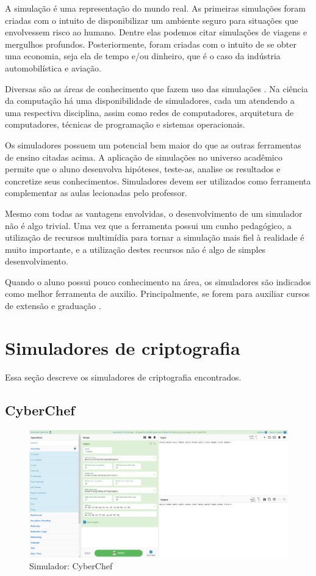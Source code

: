 A simulação é uma representação do mundo real. As primeiras simulações foram criadas com o intuito de disponibilizar um ambiente seguro para situações que envolvessem risco ao humano. Dentre elas podemos citar simulações de viagens e mergulhos profundos. Posteriormente, foram criadas com o intuito de se obter uma economia, seja ela de tempo e/ou dinheiro, que é o caso da indústria automobilística e aviação.

Diversas são as áreas de conhecimento que fazem uso das simulações \cite{banks09}. Na ciência da computação há uma disponibilidade de simuladores, cada um atendendo a uma respectiva disciplina, assim como redes de computadores, arquitetura de computadores, técnicas de programação e sistemas operacionais.

Os simuladores possuem um potencial bem maior do que as outras ferramentas de ensino citadas acima. A aplicação de simulações no universo acadêmico permite que o aluno desenvolva hipóteses, teste-as, analise os resultados e concretize seus conhecimentos. Simuladores devem ser utilizados como ferramenta complementar as aulas lecionadas pelo professor.

Mesmo com todas as vantagens envolvidas, o desenvolvimento de um simulador não é algo trivial. Uma vez que a ferramenta possui um cunho pedagógico, a utilização de recursos multimídia para tornar a simulação mais fiel à realidade é muito importante, e a utilização destes recursos não é algo de simples desenvolvimento.

Quando o aluno possui pouco conhecimento na área, os simuladores são indicados como melhor ferramenta de auxilio. Principalmente, se forem para auxiliar cursos de extensão e graduação \cite{maia01} \cite{maia03}. 

\section{Simuladores de criptografia}
\label{sec:simuladorescriptografia}
Essa seção descreve os simuladores de criptografia encontrados.

\subsection{CyberChef}

\begin{figure}[H]
    \centering
    \caption{Simulador: CyberChef}
    \label{fig:cyberchef}
    \includegraphics[width=1\linewidth]{Simuladores/CyberChef_Enigma.png}
\end{figure}

